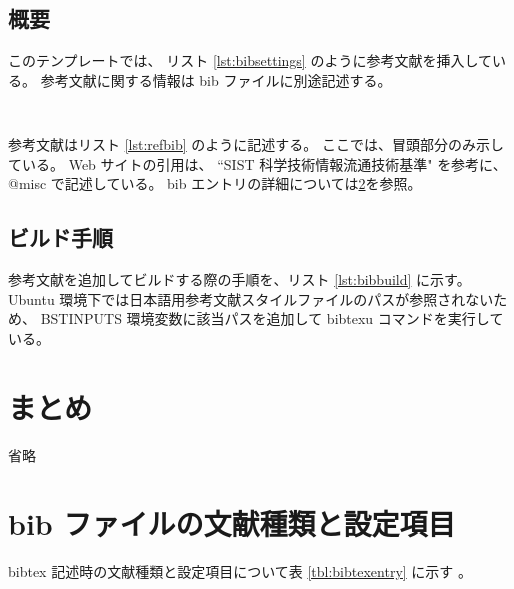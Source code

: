 \documentclass[a4paper]{ltjsarticle}
\begin{document}
\subsection{概要}

このテンプレートでは、
リスト \ref{lst:bibsettings} のように参考文献を挿入している。
参考文献に関する情報は bib ファイルに別途記述する。

\begin{lstlisting}[caption = 参考文献のスタイルと bib ファイル指定, label = lst:bibsettings]
%


\end{lstlisting}

参考文献はリスト \ref{lst:refbib} のように記述する。
ここでは、冒頭部分のみ示している。
Web サイトの引用は、
``SIST 科学技術情報流通技術基準" \cite{bib:sistref} を参考に、
@misc で記述している。
bib エントリの詳細については\ref{sec:bibentry}を参照。



\subsection{ビルド手順}

参考文献を追加してビルドする際の手順を、リスト \ref{lst:bibbuild} に示す。
Ubuntu 環境下では日本語用参考文献スタイルファイルのパスが参照されないため、
BSTINPUTS 環境変数に該当パスを追加して bibtexu コマンドを実行している。



\newpage
\section{まとめ}

省略


\newpage
%



\appendix
\newpage
\section{bib ファイルの文献種類と設定項目}
\label{sec:bibentry}

bibtex 記述時の文献種類と設定項目について表 \ref{tbl:bibtexentry} に示す \cite{bib:bibtexentry}。
\end{document}

